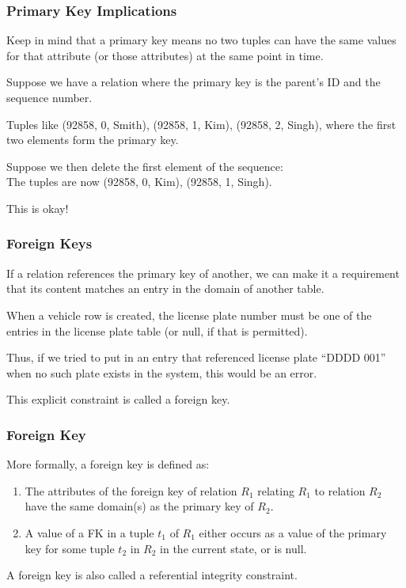 \begin{frame}
\frametitle{Primary Key Implications}

Keep in mind that a primary key means no two tuples can have the same values for that attribute (or those attributes) at the same point in time. 

Suppose we have a relation where the primary key is the parent's ID and the sequence number. 

Tuples like (92858, 0, Smith), (92858, 1, Kim), (92858, 2, Singh), where the first two elements form the primary key. 

Suppose we then delete the first element of the sequence:\\
\quad The tuples are now (92858, 0, Kim), (92858, 1, Singh). 

This is okay!

\end{frame}



\begin{frame}
\frametitle{Foreign Keys}

If a relation references the primary key of another, we can make it a requirement that its content matches an entry in the domain of another table. 

When a vehicle row is created, the license plate number must be one of the entries in the license plate table (or null, if that is permitted).

Thus, if we tried to put in an entry that referenced license plate ``DDDD 001'' when no such plate exists in the system, this would be an error. 

This explicit constraint is called a \alert{foreign key}. 


\end{frame}



\begin{frame}
\frametitle{Foreign Key}

More formally, a foreign key is defined as:
\begin{enumerate}
\item The attributes of the foreign key of relation $R_{1}$ relating $R_{1}$ to relation $R_{2}$ have the same domain(s) as the primary key of $R_{2}$.
\item A value of a FK in a tuple $t_{1}$ of $R_{1}$ either occurs as a value of the primary key for some tuple $t_{2}$ in $R_{2}$ in the current state, or is null. 
\end{enumerate}

A foreign key is also called a referential integrity constraint.

\end{frame}



